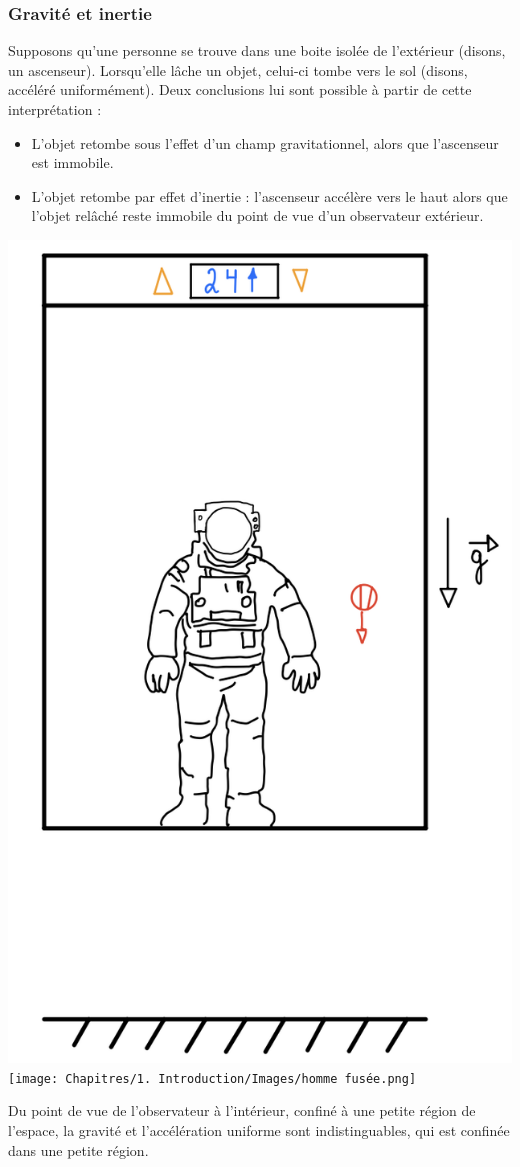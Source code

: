 \subsubsection{Gravité et inertie}
Supposons qu'une personne se trouve dans une boite isolée de l'extérieur (disons, un ascenseur). Lorsqu'elle lâche un objet, celui-ci tombe vers le sol (disons, accéléré uniformément). Deux conclusions lui sont possible à partir de cette interprétation :
\begin{itemize}
    \item L'objet retombe sous l'effet d'un champ gravitationnel, alors que l'ascenseur est immobile.
    \item L'objet retombe par effet d'inertie : l'ascenseur accélère vers le haut alors que l'objet relâché reste immobile du point de vue d'un observateur extérieur. 
\end{itemize}
\begin{center}
\includegraphics[scale=0.2]{Chapitres/1. Introduction/Images/homme ascenseur.png}
\texttt{[image: Chapitres/1. Introduction/Images/homme fusée.png]}
\end{center}
Du point de vue de l'observateur à l'intérieur, confiné à une petite région de l'espace, la gravité et l'accélération uniforme sont indistinguables, qui est confinée dans une petite région. 

